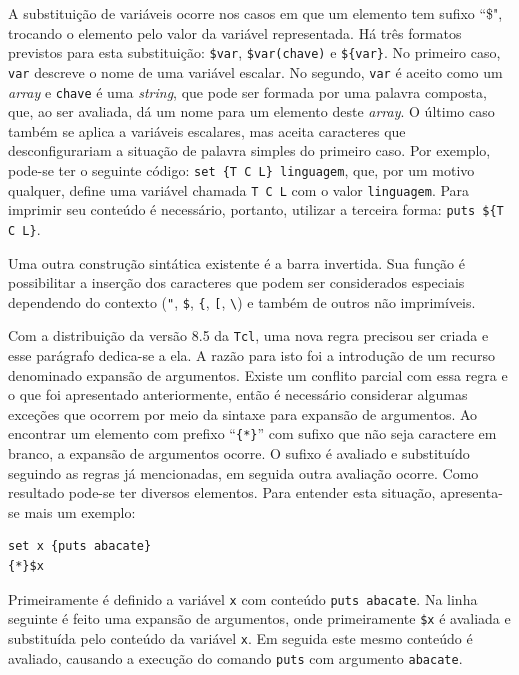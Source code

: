 A substituição de variáveis ocorre nos
casos em que um elemento tem sufixo ``\$", trocando o elemento pelo
valor da variável representada. Há três formatos previstos para esta
substituição: \verb!$var!, \verb!$var(chave)! e
\verb!${var}!. No primeiro caso, \verb!var! descreve o nome de uma
variável escalar. No segundo, \verb!var! é aceito como um \textit{array}
e \verb!chave! é uma \textit{string}, que pode ser formada
por uma palavra composta, que, ao ser avaliada, dá um nome para um
elemento deste \textit{array}. O último caso também se aplica a
variáveis escalares, mas aceita caracteres que desconfigurariam a
situação de palavra simples do primeiro caso. Por exemplo, pode-se
ter o seguinte código: \verb!set {T C L} linguagem!, que, por um
motivo qualquer, define uma variável chamada \verb!T C L! com o valor
\verb!linguagem!. Para imprimir seu conteúdo é necessário, portanto,
utilizar a terceira forma: \verb!puts ${T C L}!.

Uma outra construção sintática existente é a barra invertida. Sua
função é possibilitar a inserção dos caracteres que podem ser
considerados especiais dependendo do contexto (\verb!"!, \verb!$!,
\verb!{!, \verb![!, \verb!\!) e também de outros não imprimíveis.


Com a distribuição da versão 8.5 da \texttt{Tcl}, uma nova
regra precisou ser criada e esse parágrafo dedica-se a ela. A razão
para isto foi a introdução de um recurso denominado expansão de
argumentos. Existe um
conflito parcial com essa regra e o que foi apresentado anteriormente,
então é necessário considerar algumas exceções que ocorrem por meio da
sintaxe para expansão de argumentos. Ao encontrar um elemento com
prefixo ``\verb!{*}!'' com sufixo que não seja caractere em
branco, a expansão de argumentos ocorre. O sufixo é avaliado e
substituído seguindo as regras já mencionadas, em seguida outra
avaliação ocorre. Como resultado pode-se ter diversos elementos. Para
entender esta situação, apresenta-se mais um exemplo:
\begin{verbatim}
set x {puts abacate}
{*}$x
\end{verbatim}
Primeiramente é definido a variável \verb!x! com conteúdo
\verb!puts abacate!. Na linha seguinte é feito uma expansão de argumentos, onde
primeiramente \verb!$x! é avaliada e substituída pelo conteúdo da
variável \verb!x!. Em seguida este mesmo conteúdo é avaliado, causando
a execução do comando \verb!puts! com argumento \verb!abacate!.

